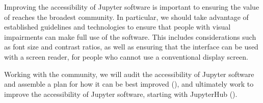 \begin{task}[
  title=Accessibility in Jupyter,
  id=accessibility,
  lead=SRL,
  PM=12,
  wphases={12-36},
  partners={}
]

  Improving the accessibility of Jupyter software
  is important to ensuring the value of \TheProject reaches the broadest community.
  In particular, we should take advantage of established guidelines and
  technologies to ensure that people with visual impairments can make full use
  of the software.
  This includes considerations such as font size and contrast ratios,
  as well as ensuring that the interface can be used with a screen reader,
  for people who cannot use a conventional display screen.

  Working with the community, we will audit the accessibility of Jupyter software and assemble a plan for how it can be best improved
  (),
  and ultimately work to improve the accessibility of Jupyter software,
  starting with JupyterHub ().
\end{task}
